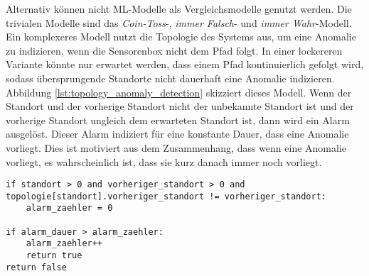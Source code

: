 Alternativ können nicht ML-Modelle als Vergleichsmodelle genutzt werden.
Die trivialen Modelle sind das \textit{Coin-Toss}-, \textit{immer Falsch}- und \textit{immer Wahr}-Modell.
Ein komplexeres Modell nutzt die Topologie des Systems aus, um eine Anomalie zu indizieren, wenn die Sensorenbox nicht dem Pfad folgt.
In einer lockereren Variante könnte nur erwartet werden, dass einem Pfad kontinuierlich gefolgt wird,
sodass übersprungende Standorte nicht dauerhaft eine Anomalie indizieren.
Abbildung \ref{lst:topology_anomaly_detection} skizziert dieses Modell.
Wenn der Standort und der vorherige Standort nicht der unbekannte Standort ist und
der vorherige Standort ungleich dem erwarteten Standort ist, dann wird ein Alarm ausgelöst.
Dieser Alarm indiziert für eine konstante Dauer, dass eine Anomalie vorliegt.
Dies ist motiviert aus dem Zusammenhang, dass wenn eine Anomalie vorliegt, es wahrscheinlich ist, dass sie kurz danach immer noch vorliegt.
\begin{lstlisting}[label=lst:topology_anomaly_detection, caption={Skizze des Modells zur Anamolieerkennung auf Basis der Topologie.}]
if standort > 0 and vorheriger_standort > 0 and topologie[standort].vorheriger_standort != vorheriger_standort:
    alarm_zaehler = 0

if alarm_dauer > alarm_zaehler:
    alarm_zaehler++
    return true
return false
\end{lstlisting}
